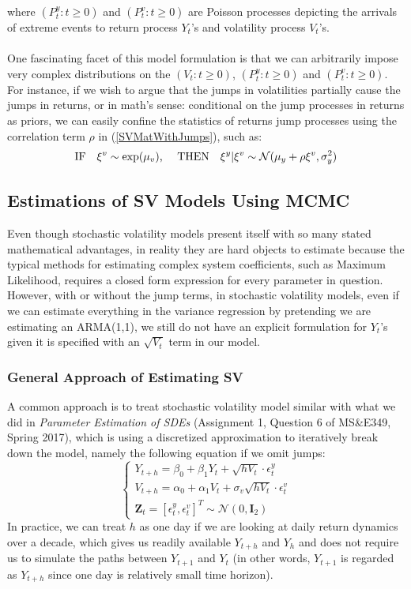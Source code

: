 \documentclass[letterpaper]{article}
\newcommand{\ZZ}{\mathbf{Z}}
\begin{document}
where $(P_t^{y}:t\geq0)$ and $(P_t^v:t\geq0)$ are Poisson processes depicting the arrivals of extreme events to return process $Y_t$'s and volatility process $V_t$'s.\\\\
One fascinating facet of this model formulation is that we can arbitrarily impose very complex distributions on the $(V_t:t\geq0)$, $(P_t^y:t\geq0)$ and $(P_t^v:t\geq0)$. For instance, if we wish to argue that the jumps in volatilities partially cause the jumps in returns, or in math's sense: conditional on the jump processes in returns as priors, we can easily confine the statistics of returns jump processes using the correlation term $\rho$ in (\ref{SVMatWithJumps}), such as:
\begin{equation}
	\text{IF\quad}\xi^v\sim\exp(\mu_v)
	\text{, \quad THEN\quad}\xi^y|\xi^v\sim\mathcal{N}(\mu_y+\rho\xi^v,\sigma_y^2)
\end{equation}
\subsection{Estimations of SV Models Using MCMC}
Even though stochastic volatility models present itself with so many stated mathematical advantages, in reality they are hard objects to estimate because the typical methods for estimating complex system coefficients, such as Maximum Likelihood, requires a closed form expression for every parameter in question. However, with or without the jump terms, in stochastic volatility models, even if we can estimate everything in the variance regression by pretending we are estimating an ARMA(1,1), we still do not have an explicit formulation for $Y_t$'s given it is specified with an $\sqrt{V_t}$ term in our model.
\subsubsection{General Approach of Estimating SV}
A common approach is to treat stochastic volatility model similar with what we did in \textit{Parameter Estimation of SDEs} (Assignment 1, Question 6 of MS\&E349, Spring 2017), which is using a discretized approximation to iteratively break down the model, namely the following equation if we omit jumps:
\begin{equation}\label{SVDiscrete}
	\begin{cases}
	Y_{t+h}=\beta_0+\beta_1Y_t+\sqrt{hV_t}\cdot\epsilon_t^y\\
	V_{t+h}=\alpha_0+\alpha_1V_t+\sigma_v\sqrt{hV_t}\cdot\epsilon_t^v\\
	\ZZ_t=[\epsilon_t^y,\epsilon_t^v]^T\sim\mathcal{N}(0,\mathbf{I}_2)
	\end{cases}
\end{equation} 
In practice, we can treat $h$ as one day if we are looking at daily return dynamics over a decade, which gives us readily available $Y_{t+h}$ and $Y_h$ and does not require us to simulate the paths between $Y_{t+1}$ and $Y_t$ (in other words, $Y_{t+1}$ is regarded as $Y_{t+h}$ since one day is relatively small time horizon).
\end{document}
